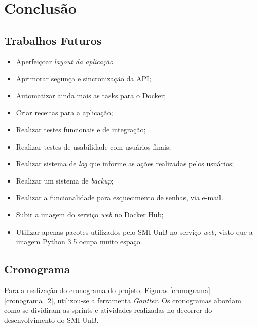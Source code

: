 \chapter{Conclusão}

\section{Trabalhos Futuros}

\begin{itemize}
    \item Aperfeiçoar \textit{layout da aplicação}
    \item Aprimorar segunça e sincronização da API;
    \item Automatizar ainda mais as tasks para o Docker;
    \item Criar receitas para a aplicação;
    \item Realizar testes funcionais e de integração;
    \item Realizar testes de usabilidade com usuários finais;
    \item Realizar sistema de \textit{log} que informe as ações realizadas pelos usuários;
    \item Realizar um sistema de \textit{backup};
    \item Realizar a funcionalidade para esquecimento de senhas, via e-mail.
    \item Subir a imagem do serviço \textit{web} no Docker Hub;
    \item Utilizar apenas pacotes utilizados pelo SMI-UnB no serviço \textit{web}, visto que a imagem Python 3.5 ocupa muito espaço.
\end{itemize}

\section{Cronograma}
Para a realização do cronograma do projeto, Figuras \ref{cronograma} \ref{cronograma_2}, utilizou-se a ferramenta \textit{Gantter}. Os cronogramas abordam como se dividiram as sprints e atividades realizadas no decorrer do desenvolvimento do SMI-UnB.

